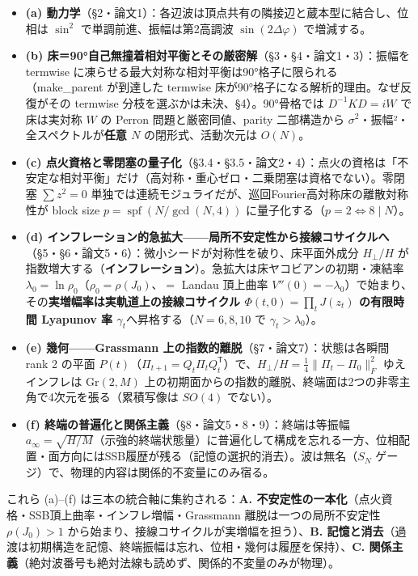 \documentclass[
  a4paper,
]{ltjsarticle}
\providecommand{\tightlist}{%
  \setlength{\itemsep}{0pt}\setlength{\parskip}{0pt}}
\begin{document}
\begin{itemize}
\tightlist
\item
  \textbf{(a)
  動力学}（§2・論文1）：各辺波は頂点共有の隣接辺と蔵本型に結合し、位相は
  \(\sin^2\) で単調前進、振幅は第2高調波 \(\sin(2\Delta\varphi)\)
  で増減する。
\item
  \textbf{(b)
  床＝90°自己無撞着相対平衡とその厳密解}（§3・§4・論文1・3）：振幅を
  termwise に凍らせる最大対称な相対平衡は90°格子に限られる（make\_parent
  が到達した termwise 床が90°格子になる解析的理由。なぜ反復がその
  termwise 分枝を選ぶかは未決、§4）。90°骨格では \(D^{-1}KD=iW\)
  で床は実対称 \(W\) の Perron 問題と厳密同値、parity 二部構造から
  \(\sigma^2\)・振幅²・全スペクトルが\textbf{任意 \(N\)}
  の閉形式、活動次元は \(O(N)\)。
\item
  \textbf{(c)
  点火資格と零閉塞の量子化}（§3.4・§3.5・論文2・4）：点火の資格は「不安定な相対平衡」だけ（高対称・重心ゼロ・二乗閉塞は資格でない）。零閉塞
  \(\sum z^2=0\)
  単独では連続モジュライだが、巡回Fourier高対称床の離散対称性が block
  size \(p=\operatorname{spf}(N/\gcd(N,4))\)
  に量子化する（\(p=2\iff 8\mid N\)）。
\item
  \textbf{(d)
  インフレーション的急拡大------局所不安定性から接線コサイクルへ}（§5・§6・論文5・6）：微小シードが対称性を破り、床平面外成分
  \(H_\perp/H\)
  が指数増大する（\textbf{インフレーション}）。急拡大は床ヤコビアンの初期・凍結率
  \(\lambda_0=\ln\rho_0\)（\(\rho_0=\rho(J_0)\)、\(=\) Landau 頂上曲率
  \(V''(0)=-\lambda_0\)）で始まり、その\textbf{実増幅率は実軌道上の接線コサイクル
  \(\Phi(t,0)=\prod_t J(z_t)\) の有限時間 Lyapunov 率
  \(\gamma_t\)}へ昇格する（\(N=6,8,10\) で \(\gamma_t>\lambda_0\)）。
\item
  \textbf{(e) 幾何------Grassmann
  上の指数的離脱}（§7・論文7）：状態は各瞬間 rank 2 の平面
  \(P(t)\)（\(\Pi_{t+1}=Q_t\Pi_tQ_t^{\mathsf T}\)）で、\(H_\perp/H=\tfrac14\|\Pi_t-\Pi_0\|_F^2\)
  ゆえインフレは \(\mathrm{Gr}(2,M)\)
  上の初期面からの指数的離脱、終端面は2つの非零主角で4次元を張る（累積写像は
  \(SO(4)\) でない）。
\item
  \textbf{(f) 終端の普遍化と関係主義}（§8・論文5・8・9）：終端は等振幅
  \(a_\infty=\sqrt{H/M}\)（示強的終端状態量）に普遍化して構成を忘れる一方、位相配置・面方向にはSSB履歴が残る（記憶の選択的消去）。波は無名（\(S_N\)
  ゲージ）で、物理的内容は関係的不変量にのみ宿る。
\end{itemize}

これら (a)--(f) は三本の統合軸に集約される：\textbf{A.
不安定性の一本化}（点火資格・SSB頂上曲率・インフレ増幅・Grassmann
離脱は一つの局所不安定性 \(\rho(J_0)>1\)
から始まり、接線コサイクルが実増幅を担う）、\textbf{B.
記憶と消去}（過渡は初期構造を記憶、終端振幅は忘れ、位相・幾何は履歴を保持）、\textbf{C.
関係主義}（絶対波番号も絶対法線も読めず、関係的不変量のみが物理）。
\end{document}

